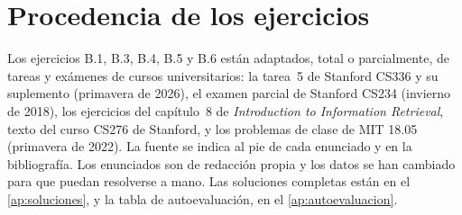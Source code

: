\section*{Procedencia de los ejercicios}
Los ejercicios B.1, B.3, B.4, B.5 y B.6 están adaptados, total o parcialmente, de tareas y exámenes de cursos universitarios: la tarea~5 de Stanford CS336 y su suplemento (primavera de 2026), el examen parcial de Stanford CS234 (invierno de 2018), los ejercicios del capítulo~8 de \emph{Introduction to Information Retrieval}, texto del curso CS276 de Stanford, y los problemas de clase de MIT 18.05 (primavera de 2022). La fuente se indica al pie de cada enunciado y en la bibliografía. Los enunciados son de redacción propia y los datos se han cambiado para que puedan resolverse a mano. Las soluciones completas están en el \cref{ap:soluciones}, y la tabla de autoevaluación, en el \cref{ap:autoevaluacion}.
